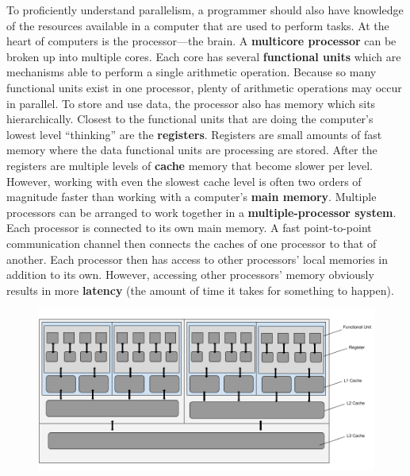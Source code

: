 \documentclass{article}
\begin{document}
    To proficiently understand parallelism, a programmer should also have knowledge of the resources available in a computer that are used to perform tasks. At the heart of computers is the processor—the brain. A \textbf{multicore processor} can be broken up into multiple cores. Each core has several \textbf{functional units} which are mechanisms able to perform a single arithmetic operation. Because so many functional units exist in one processor, plenty of arithmetic operations may occur in parallel. To store and use data, the processor also has memory which sits hierarchically. Closest to the functional units that are doing the computer's lowest level ``thinking'' are the \textbf{registers}. Registers are small amounts of fast memory where the data functional units are processing are stored. After the registers are multiple levels of \textbf{cache} memory that become slower per level. However, working with even the slowest cache level is often two orders of magnitude faster than working with a computer's \textbf{main memory}. Multiple processors can be arranged to work together in a \textbf{multiple-processor system}. Each processor is connected to its own main memory. A fast point-to-point communication channel then connects the caches of one processor to that of another. Each processor then has access to other processors' local memories in addition to its own. However, accessing other processors' memory obviously results in more \textbf{latency} (the amount of time it takes for something to happen). 
\begin{figure}[H]
        \centering
        \includegraphics[width=0.75\linewidth]{Processors & Memory Hierarchy Diagram.png}
\end{figure}
\end{document}
